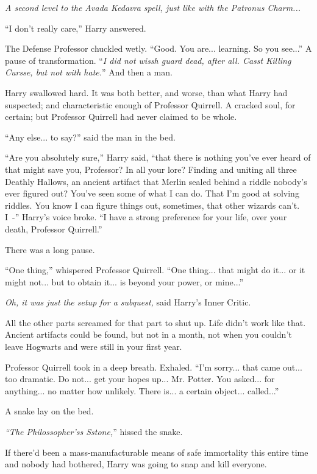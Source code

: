 \emph{A second level to the Avada Kedavra spell, just like with the Patronus Charm...}

``I don't really care,'' Harry answered.

The Defense Professor chuckled wetly. ``Good. You are... learning. So you see...'' A pause of transformation. ``\emph{I did not wissh guard dead, after all. Casst Killing Cursse, but not with hate.}'' And then a man.

Harry swallowed hard. It was both better, and worse, than what Harry had suspected; and characteristic enough of Professor Quirrell. A cracked soul, for certain; but Professor Quirrell had never claimed to be whole.

``Any else... to say?'' said the man in the bed.

``Are you absolutely sure,'' Harry said, ``that there is nothing you've ever heard of that might save you, Professor? In all your lore? Finding and uniting all three Deathly Hallows, an ancient artifact that Merlin sealed behind a riddle nobody's ever figured out? You've seen some of what I can do. That I'm good at solving riddles. You know I can figure things out, sometimes, that other wizards can't. I~-'' Harry's voice broke. ``I have a strong preference for your life, over your death, Professor Quirrell.''

There was a long pause.

``One thing,'' whispered Professor Quirrell. ``One thing... that might do it... or it might not... but to obtain it... is beyond your power, or mine...''

\emph{Oh, it was just the setup for a subquest,} said Harry's Inner Critic.

All the other parts screamed for that part to shut up. Life didn't work like that. Ancient artifacts could be found, but not in a month, not when you couldn't leave Hogwarts and were still in your first year.

Professor Quirrell took in a deep breath. Exhaled. ``I'm sorry... that came out... too dramatic. Do not... get your hopes up... Mr. Potter. You asked... for anything... no matter how unlikely. There is... a certain object... called...''

A snake lay on the bed.

\emph{``The Philossopher'ss Sstone,}'' hissed the snake.

If there'd been a mass-manufacturable means of safe immortality this entire time and nobody had bothered, Harry was going to snap and kill everyone.

